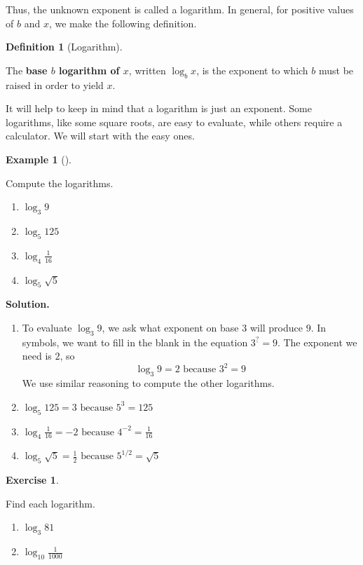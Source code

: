 \documentclass[10pt,]{book}
\newcommand{\terminology}[1]{\textbf{#1}}
\theoremstyle{plain}
\theoremstyle{definition}
\newtheorem{definition}[theorem]{Definition}
\theoremstyle{definition}
\theoremstyle{definition}
\newtheorem{example}[theorem]{Example}
\theoremstyle{definition}
\theoremstyle{definition}
\newtheorem{exercise}[theorem]{Exercise}
\numberwithin{equation}{section}
\begin{document}
	Thus, the unknown exponent is called a logarithm. In general, for positive values of \(b\) and \(x\), we make the following definition.
%
\begin{definition}[Logarithm]\label{definition-10}

	The \terminology{base \(b\) logarithm of \(x\)}, written \(\log_{b} x\), is the exponent to which \(b\) must be raised in order to yield \(x\).
\end{definition}
\par

	It will help to keep in mind that a logarithm is just an exponent. Some logarithms, like some square roots, are easy to evaluate, while others require a calculator. We will start with the easy ones.
%
\begin{example}[]\label{example-easy-logarithm}

	Compute the logarithms.
	\leavevmode%
\begin{enumerate}[label=*\alph**]
\item\hypertarget{li-683}{}\(\log_3 9\)\item\hypertarget{li-684}{}\(\log_5 125 \)\item\hypertarget{li-685}{}\(\log_4 \frac{1}{16}\)\item\hypertarget{li-686}{}\(\log_5 \sqrt{5}\)\end{enumerate}

%
\par\medskip\noindent%
\textbf{Solution.}\quad \leavevmode%
\begin{enumerate}[label=*\alph**]
\item\hypertarget{li-687}{}
		To evaluate \(\log_3 9\), we ask what exponent on base \(3\) will produce \(9\). In symbols, we want to fill in the blank in the equation \(3^{\underline{?}} = 9\). The exponent we need is \(2\), so
		\begin{equation*}\log_3 9 = 2 \text{ because } 3^2 = 9\end{equation*}
		We use similar reasoning to compute the other logarithms.
	\item\hypertarget{li-688}{}\(\log_5{125} = 3 \text{ because } 5^3 = 125\)\item\hypertarget{li-689}{}\(\log_4{\frac{1}{16}}= −2 \text{ because } 4^{−2} = \frac{1}{16}\)\item\hypertarget{li-690}{}\(\log_5{\sqrt{5}} = \frac{1}{2} \text{ because } 5^{1/2} =\sqrt{5}\)\end{enumerate}
\end{example}
\begin{exercise}\label{exercise-easy-logarithms}

	Find each logarithm.
	\leavevmode%
\begin{enumerate}[label=*\alph**]
\item\hypertarget{li-691}{}\(\log_{3}{81}\)\item\hypertarget{li-692}{}\(\log_{10}{\frac{1}{1000}}\)\end{enumerate}
\end{exercise}
\par
\end{document}
